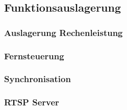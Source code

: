 \subsection{Funktionsauslagerung}
\label{subsec:funktionsauslagerung}

\subsubsection{Auslagerung Rechenleistung}

\subsubsection{Fernsteuerung}

\subsubsection{Synchronisation}

\subsubsection{RTSP Server}
